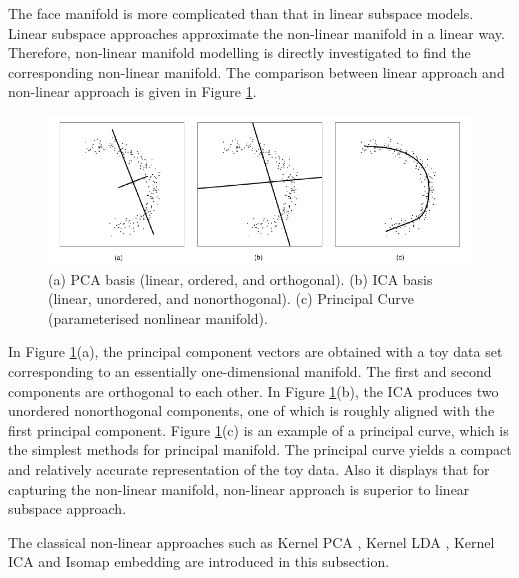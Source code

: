The face manifold is more complicated than that in linear subspace models. Linear subspace approaches approximate the non-linear manifold in a linear way. Therefore, non-linear manifold modelling is directly investigated to find the corresponding non-linear manifold. The comparison between linear approach and non-linear approach is given in \mbox{Figure} \ref{fig:linearvsnon-linear}.
\begin{figure}[ht]
\begin{center}
 \includegraphics[width=\columnwidth]{ch2/figures/linearvsnonlinear.jpg}
\caption{(a) PCA basis (linear, ordered, and orthogonal). (b) ICA basis (linear, unordered, and nonorthogonal). (c) Principal Curve (parameterised nonlinear manifold). \cite{Moghaddam2002}}
\label{fig:linearvsnon-linear}
\end{center}
\end{figure} 
In \mbox{Figure} \ref{fig:linearvsnon-linear}(a), the principal component vectors are obtained with a toy data set corresponding to an essentially one-dimensional manifold. The first and second components are orthogonal to each other. In \mbox{Figure} \ref{fig:linearvsnon-linear}(b), the ICA produces two unordered nonorthogonal components, one of which is roughly aligned with the first principal component. \mbox{Figure} \ref{fig:linearvsnon-linear}(c) is an example of a principal curve, which is the simplest methods for principal manifold. The principal curve yields a compact and relatively accurate representation of the toy data. Also it displays that for capturing the non-linear manifold, non-linear approach is superior to linear subspace approach.

The classical non-linear approaches such as Kernel PCA \cite{Scholkopf1998}, Kernel LDA \cite{Yang2002}, Kernel ICA  \cite{Bach2002} and Isomap embedding \cite{Tenenbaum2000} are introduced in this subsection.
